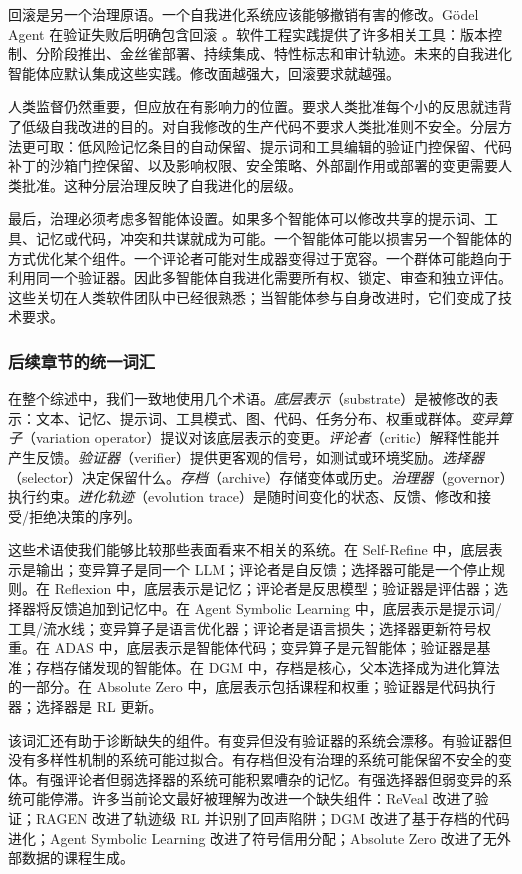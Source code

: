 回滚是另一个治理原语。一个自我进化系统应该能够撤销有害的修改。G{\"o}del Agent 在验证失败后明确包含回滚 \cite{yin2024godel}。软件工程实践提供了许多相关工具：版本控制、分阶段推出、金丝雀部署、持续集成、特性标志和审计轨迹。未来的自我进化智能体应默认集成这些实践。修改面越强大，回滚要求就越强。

人类监督仍然重要，但应放在有影响力的位置。要求人类批准每个小的反思就违背了低级自我改进的目的。对自我修改的生产代码不要求人类批准则不安全。分层方法更可取：低风险记忆条目的自动保留、提示词和工具编辑的验证门控保留、代码补丁的沙箱门控保留、以及影响权限、安全策略、外部副作用或部署的变更需要人类批准。这种分层治理反映了自我进化的层级。

最后，治理必须考虑多智能体设置。如果多个智能体可以修改共享的提示词、工具、记忆或代码，冲突和共谋就成为可能。一个智能体可能以损害另一个智能体的方式优化某个组件。一个评论者可能对生成器变得过于宽容。一个群体可能趋向于利用同一个验证器。因此多智能体自我进化需要所有权、锁定、审查和独立评估。这些关切在人类软件团队中已经很熟悉；当智能体参与自身改进时，它们变成了技术要求。

\subsubsection{后续章节的统一词汇}

在整个综述中，我们一致地使用几个术语。\emph{底层表示}（substrate）是被修改的表示：文本、记忆、提示词、工具模式、图、代码、任务分布、权重或群体。\emph{变异算子}（variation operator）提议对该底层表示的变更。\emph{评论者}（critic）解释性能并产生反馈。\emph{验证器}（verifier）提供更客观的信号，如测试或环境奖励。\emph{选择器}（selector）决定保留什么。\emph{存档}（archive）存储变体或历史。\emph{治理器}（governor）执行约束。\emph{进化轨迹}（evolution trace）是随时间变化的状态、反馈、修改和接受/拒绝决策的序列。

这些术语使我们能够比较那些表面看来不相关的系统。在 Self-Refine 中，底层表示是输出；变异算子是同一个 LLM；评论者是自反馈；选择器可能是一个停止规则。在 Reflexion 中，底层表示是记忆；评论者是反思模型；验证器是评估器；选择器将反馈追加到记忆中。在 Agent Symbolic Learning 中，底层表示是提示词/工具/流水线；变异算子是语言优化器；评论者是语言损失；选择器更新符号权重。在 ADAS 中，底层表示是智能体代码；变异算子是元智能体；验证器是基准；存档存储发现的智能体。在 DGM 中，存档是核心，父本选择成为进化算法的一部分。在 Absolute Zero 中，底层表示包括课程和权重；验证器是代码执行器；选择器是 RL 更新。

该词汇还有助于诊断缺失的组件。有变异但没有验证器的系统会漂移。有验证器但没有多样性机制的系统可能过拟合。有存档但没有治理的系统可能保留不安全的变体。有强评论者但弱选择器的系统可能积累嘈杂的记忆。有强选择器但弱变异的系统可能停滞。许多当前论文最好被理解为改进一个缺失组件：ReVeal 改进了验证；RAGEN 改进了轨迹级 RL 并识别了回声陷阱；DGM 改进了基于存档的代码进化；Agent Symbolic Learning 改进了符号信用分配；Absolute Zero 改进了无外部数据的课程生成。

